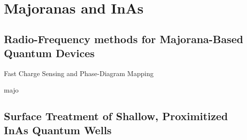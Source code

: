 \chapter{Majoranas and InAs}
\label{sec:majoinas}

\clearpage
\section{Radio-Frequency methods for {Majorana-Based} {Quantum} {Devices}}
{\large \bf \begin{center}Fast Charge Sensing and Phase-Diagram Mapping\end{center}}
\label{sec:rfmajo}
{majo}

\clearpage
\section{Surface Treatment of Shallow, Proximitized InAs Quantum Wells}
\label{sec:inas_hb}